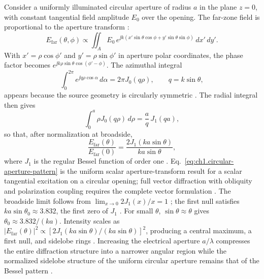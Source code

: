 Consider a uniformly illuminated circular aperture of radius $a$ in the plane $z=0$, with constant tangential field amplitude $E_0$ over the opening. The far-zone field is proportional to the aperture transform \cite{stratton1941,silver1949,bornwolf1999}:
\begin{equation}
\label{eq:ch1.aperture-fraunhofer-start}
E_{\mathrm{far}}(\theta,\phi)\propto
\iint_A E_0\,e^{\jj k(x'\sin\theta\cos\phi+y'\sin\theta\sin\phi)}\,dx'\,dy'.
\end{equation}
With $x'=\rho\cos\phi'$ and $y'=\rho\sin\phi'$ in aperture polar coordinates, the phase factor becomes $e^{\jj k\rho\sin\theta\cos(\phi'-\phi)}$. The azimuthal integral
\begin{equation}
\label{eq:ch1.bessel-integral-identity}
\int_0^{2\pi}e^{\jj q\rho\cos\alpha}\,d\alpha=2\pi J_0(q\rho),
\qquad q=k\sin\theta,
\end{equation}
appears because the source geometry is circularly symmetric \cite{stratton1941,harrington2001}. The radial integral then gives
\begin{equation}
\label{eq:ch1.circular-radial-integral}
\int_0^a \rho J_0(q\rho)\,d\rho=\frac{a}{q}\,J_1(qa),
\end{equation}
so that, after normalization at broadside,
\begin{equation}
\label{eq:ch1.circular-aperture-pattern}
\frac{E_{\mathrm{far}}(\theta)}{E_{\mathrm{far}}(0)}
=\frac{2J_1(ka\sin\theta)}{ka\sin\theta},
\end{equation}
where $J_1$ is the regular Bessel function of order one \cite{silver1949,stratton1941}. Eq.~\eqref{eq:ch1.circular-aperture-pattern} is the uniform scalar aperture-transform result for a scalar tangential excitation on a circular opening; full vector diffraction with obliquity and polarization coupling requires the complete vector formulation \cite{stratton1941,silver1949}. The broadside limit follows from $\lim_{x\to0}2J_1(x)/x=1$ \cite{stratton1941}; the first null satisfies $ka\sin\theta_0\approx 3.832$, the first zero of $J_1$ \cite{silver1949}. For small $\theta$, $\sin\theta\approx\theta$ gives $\theta_0\approx 3.832/(ka)$. Intensity scales as $|E_{\mathrm{far}}(\theta)|^2\propto[2J_1(ka\sin\theta)/(ka\sin\theta)]^2$, producing a central maximum, a first null, and sidelobe rings \cite{bornwolf1999}. Increasing the electrical aperture $a/\lambda$ compresses the entire diffraction structure into a narrower angular region while the normalized sidelobe structure of the uniform circular aperture remains that of the Bessel pattern \cite{silver1949,stratton1941}.

